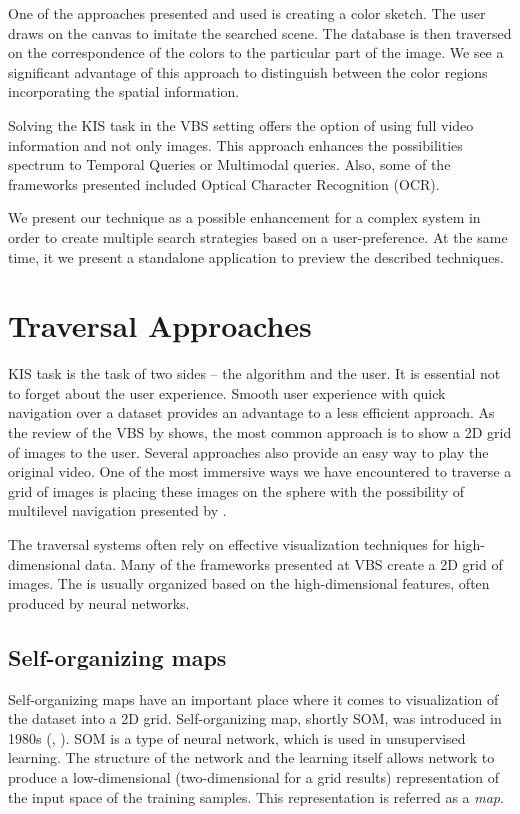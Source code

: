 One of the approaches presented and used is creating a color sketch. The user draws on the canvas to imitate the searched scene. The database is then traversed on the correspondence of the colors to the particular part of the image. We see a significant advantage of this approach to distinguish between the color regions incorporating the spatial information.
 
Solving the KIS task in the VBS setting offers the option of using full video information and not only images. This approach enhances the possibilities spectrum to Temporal Queries or Multimodal queries. Also, some of the frameworks presented included Optical Character Recognition (OCR).

We present our technique as a possible enhancement for a complex system in order to create multiple search strategies based on a user-preference. At the same time, it we present a standalone application to preview the described techniques.

\section{Traversal Approaches}

KIS task is the task of two sides -- the algorithm and the user. It is essential not to forget about the user experience. Smooth user experience with quick navigation over a dataset provides an advantage to a less efficient approach. As the review of the VBS by \cite{rossetto2020interactive} shows, the most common approach is to show a 2D grid of images to the user. Several approaches also provide an easy way to play the original video. One of the most immersive ways we have encountered to traverse a grid of images is placing these images on the sphere with the possibility of multilevel navigation presented by \cite{quadrianto2010beyond}.

The traversal systems often rely on effective visualization techniques for high-dimensional data. Many of the frameworks presented at VBS create a 2D grid of images. The is usually organized based on the high-dimensional features, often produced by neural networks. 

\subsection*{Self-organizing maps}

Self-organizing maps have an important place where it comes to visualization of the dataset into a 2D grid. Self-organizing map, shortly SOM, was introduced in 1980s (\cite{kohonen1982self}, \cite{kohonen2007kohonen}). SOM is a type of neural network, which is used in unsupervised learning. The structure of the network and the learning itself allows network to produce a low-dimensional (two-dimensional for a grid results) representation of the input space of the training samples. This representation is referred as a \emph{map}.

